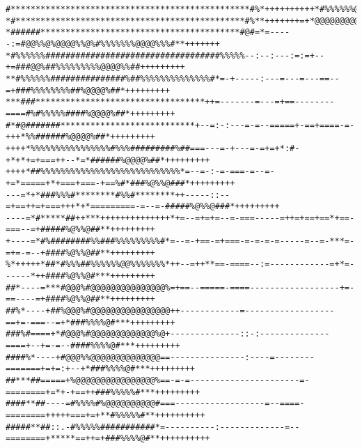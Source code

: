 \documentclass[a4paper, 12pt, oneside]{article}
\begin{document}






\nocite{*}  %
\printbibliography


\tiny\color{red}\begin{verbatim}
#************************************************#%*++++++++++*#%%%%%%@%%@@@@@%###**####**#***++++++
*#**********************************************#%**+++++++=+*@@@@@@@@@%%%%%%%%%%%%@%%%@%%#**+++++++
*######****************************************#@#=*=-----:=#@@%%@%@@@@%%@%#%%%%%%%@@@@%%%#**+++++++
*#%%%%%%###################################%%%%%--:--:---:=:=+--+=###@@%##%%%%%%%%%@@@@%%##+++++++++
**#%%%%%%###############%##%%%%%%%%%%%%%%#*=-+-----:---=---=---==--=+###%%%%%%%%##%@@@@%##*+++++++++
***###**********************************++=-------=---=+==--------====#%#%%%%%####%@@@@%##*+++++++++
#*#@#######***************************+--=:-:---=-=--=====+-==+====-=-+++*%%######%@@@@%##*+++++++++
++++*%%%%%%%%%%%%%%%%#%%%#########%##===---=-+---=-=+=+*:#-+*+*+=+===++--*=*######%@@@@%##*+++++++++
++++*##%%%%%%%%%%%%%%%%%%%%%%%%%%%%*=--=-:-=-===-=--=-+=*=====+*+===+===-+==%#*###%@%%@###*+++++++++
---=*+*###%%%#********#%%#********++-----::--=+==++=+===+++*+*=========-=--=-#####%@%%@###*+++++++++
----=*#*****##++***++++++++++++++*+=--=+=+=--=-===-----=++=+==+==*+==-===--=+#####%@%%@##**+++++++++
+----=*#%########%%###%%%%%%%%%#*=--=-+==-=+===-=-=-=-=-----=--=-***=-=+=-=--+####%@%%@##**+++++++++
%*+++++*##*#%%%##%%%%%%@@%%%%%%%*++--=++**==-====--:=------------=+*=------*++####%@%%@#***+++++++++
##*----=***#@@@%#@@@@@@@@@@@@@@@%=+==--=====-====------------------+=-==----=+####%@%%@##**+++++++++
##%*----+##%@@@%#@@@@@@@@@@@@@@@@++------------=------------------==+=-===--=+*###%%%%@#***+++++++++
###%#====+*#@@@%#@@@@@@@@@@@@@%@+--------------::-:--------------====+--+=-=--####%%%%@#***+++++++++
####%*----+#@@@%%@@@@@@@@@@@@@@==---------------:----=--------=======+=+=:+--+*###%%%%@#***+++++++++
##***##=====+%@@@@@@@@@@@@@@@@%==-=-=----------------------=-========+=*+-+==++###%%%%%#***+++++++++
####**##----=#%%%%#%@@@@@@@@@@#===------------------=--====-========+++++===+=+**#%%%%%#**++++++++++
#####**##::.-#%%%%%###########*=----------:-------------=--========+*****==++=+###%%%%@#**++++++++++

\end{verbatim}
\end{document}
